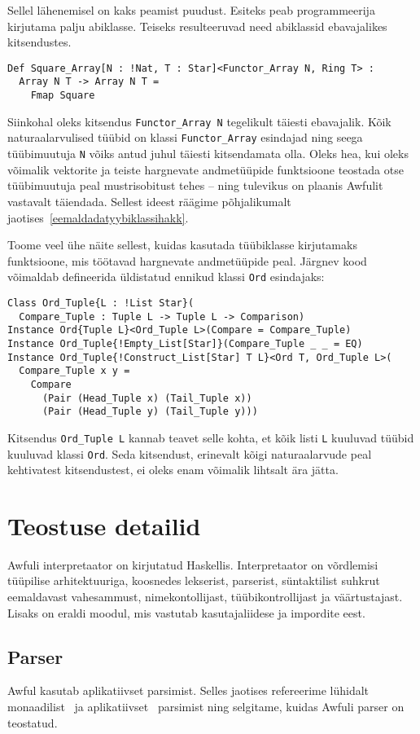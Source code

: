 \documentclass[12pt]{article}
\newcommand\peatykk[1]{
  \clearpage
  \section{#1}}
\begin{document}
      Sellel lähenemisel on kaks peamist puudust. Esiteks peab programmeerija kirjutama palju abiklasse. Teiseks resulteeruvad need abiklassid ebavajalikes kitsendustes.

      \begin{verbatim}Def Square_Array[N : !Nat, T : Star]<Functor_Array N, Ring T> :
  Array N T -> Array N T =
    Fmap Square\end{verbatim}

      Siinkohal oleks kitsendus \verb!Functor_Array N! tegelikult täiesti ebavajalik. Kõik naturaalarvulised tüübid on klassi \verb!Functor_Array! esindajad ning seega tüübimuutuja \verb!N! võiks antud juhul täiesti kitsendamata olla. Oleks hea, kui oleks võimalik vektorite ja teiste hargnevate andmetüüpide funktsioone teostada otse tüübimuutuja peal mustrisobitust tehes -- ning tulevikus on plaanis Awfulit vastavalt täiendada. Sellest ideest räägime põhjalikumalt jaotises~\ref{eemaldadatyybiklassihakk}.

      Toome veel ühe näite sellest, kuidas kasutada tüübiklasse kirjutamaks funktsioone, mis töötavad hargnevate andmetüüpide peal. Järgnev kood võimaldab defineerida üldistatud ennikud klassi \verb!Ord! esindajaks:

      \begin{verbatim}Class Ord_Tuple{L : !List Star}(
  Compare_Tuple : Tuple L -> Tuple L -> Comparison)
Instance Ord{Tuple L}<Ord_Tuple L>(Compare = Compare_Tuple)
Instance Ord_Tuple{!Empty_List[Star]}(Compare_Tuple _ _ = EQ)
Instance Ord_Tuple{!Construct_List[Star] T L}<Ord T, Ord_Tuple L>(
  Compare_Tuple x y =
    Compare
      (Pair (Head_Tuple x) (Tail_Tuple x))
      (Pair (Head_Tuple y) (Tail_Tuple y)))\end{verbatim}

      Kitsendus \verb!Ord_Tuple L! kannab teavet selle kohta, et kõik listi \verb!L! kuuluvad tüübid kuuluvad klassi \verb!Ord!. Seda kitsendust, erinevalt kõigi naturaalarvude peal kehtivatest kitsendustest, ei oleks enam võimalik lihtsalt ära jätta.
  \peatykk{Teostuse detailid}
    Awfuli interpretaator on kirjutatud Haskellis. Interpretaator on võrdlemisi tüüpilise arhitektuuriga, koosnedes lekserist, parserist, süntaktilist suhkrut eemaldavast vahesammust, nimekontollijast, tüübikontrollijast ja väärtustajast. Lisaks on eraldi moodul, mis vastutab kasutajaliidese ja impordite eest.
    \subsection{Parser}
      Awful kasutab aplikatiivset parsimist. Selles jaotises refereerime lühidalt monaadilist~\cite{Mon} ja aplikatiivset~\cite{App} parsimist ning selgitame, kuidas Awfuli parser on teostatud.
\end{document}
